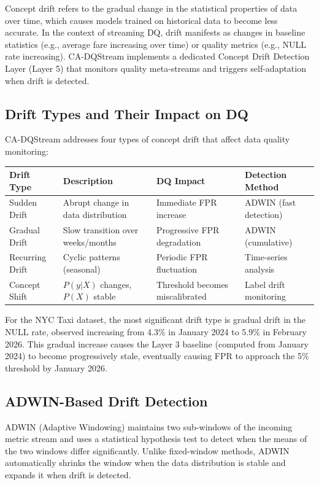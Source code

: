 Concept drift refers to the gradual change in the statistical properties of data over time, which causes models trained on historical data to become less accurate. In the context of streaming DQ, drift manifests as changes in baseline statistics (e.g., average fare increasing over time) or quality metrics (e.g., NULL rate increasing). CA-DQStream implements a dedicated Concept Drift Detection Layer (Layer 5) that monitors quality meta-streams and triggers self-adaptation when drift is detected.

\subsection{Drift Types and Their Impact on DQ}

CA-DQStream addresses four types of concept drift that affect data quality monitoring:

\begin{longtable}{|m{3.5cm}|m{3.5cm}|m{4cm}|m{4cm}|}
\hline
\textbf{Drift Type} & \textbf{Description} & \textbf{DQ Impact} & \textbf{Detection Method} \\ \hline
Sudden Drift & Abrupt change in data distribution & Immediate FPR increase & ADWIN (fast detection) \\ \hline
Gradual Drift & Slow transition over weeks/months & Progressive FPR degradation & ADWIN (cumulative) \\ \hline
Recurring Drift & Cyclic patterns (seasonal) & Periodic FPR fluctuation & Time-series analysis \\ \hline
Concept Shift & $P(y|X)$ changes, $P(X)$ stable & Threshold becomes miscalibrated & Label drift monitoring \\ \hline
\end{longtable}

For the NYC Taxi dataset, the most significant drift type is gradual drift in the NULL rate, observed increasing from 4.3\% in January 2024 to 5.9\% in February 2026. This gradual increase causes the Layer 3 baseline (computed from January 2024) to become progressively stale, eventually causing FPR to approach the 5\% threshold by January 2026.

\subsection{ADWIN-Based Drift Detection}

ADWIN (Adaptive Windowing) maintains two sub-windows of the incoming metric stream and uses a statistical hypothesis test to detect when the means of the two windows differ significantly. Unlike fixed-window methods, ADWIN automatically shrinks the window when the data distribution is stable and expands it when drift is detected.

